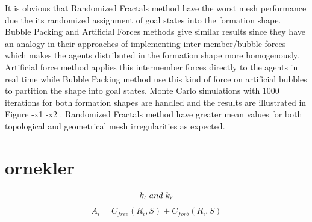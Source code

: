 \documentclass[twoside]{article}
\begin{document}
		It is obvious that Randomized Fractals method have the worst mesh performance due the its randomized assignment of goal states into the formation shape. Bubble Packing and Artificial Forces methods give similar results since they have an analogy in their approaches of implementing inter member/bubble forces which makes the agents distributed in the formation shape more homogenously. Artificial force method applies this intermember forces directly to the agents in real time while Bubble Packing method use this kind of force on artificial bubbles to partition the shape into goal states. Monte Carlo simulations with 1000 iterations for both formation shapes are handled and the results are illustrated in Figure -x1 -x2 . Randomized Fractals method have greater mean values for both topological and geometrical mesh irregularities as expected. 
		
		
		
		
		
		
		
		
		
		
		
		
		
		
		
		
		
		
		
		
		
		
		
		
		
		
		
		
		
		
		
		
		
		
		
		
		
		
		
		
		
		
		
		
		
		
		
		
		\section{ornekler}
		
		\begin{equation}
 k_t  \hspace{0.1cm}and\hspace{0.1cm} k_r
		\end{equation}
			\begin{equation}
			A_i = C_{free}(R_i,S) + C_{forb}(R_i,S)
			\end{equation}	
			
\end{document}
